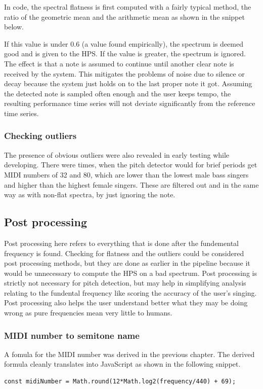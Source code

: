 In code, the spectral flatness is first computed with a fairly typical method, the ratio of the geometric mean and the arithmetic mean as shown in the snippet below.

If this value is under $0.6$ (a value found empirically), the spectrum is deemed good and is given to the HPS. If the value is greater, the spectrum is ignored. The effect is that a note is assumed to continue until another clear note is received by the system. This mitigates the problems of noise due to silence or decay because the system just holds on to the last proper note it got. Assuming the detected note is sampled often enough and the user keeps tempo, the resulting performance time series will not deviate significantly from the reference time series.

\subsubsection{Checking outliers}
The presence of obvious outliers were also revealed in early testing while developing. There were times, when the pitch detector would for brief periods get MIDI numbers of 32 and 80, which are lower than the lowest male bass singers and higher than the highest female singers. These are filtered out and in the same way as with non-flat spectra, by just ignoring the note. 

\subsection{Post processing}
Post processing here refers to everything that is done after the fundemental frequency is found. Checking for flatness and the outliers could be considered post processing methods, but they are done as earlier in the pipeline because it would be unnecessary to compute the HPS on a bad spectrum. Post processing is strictly not necessary for pitch detection, but may help in simplifying analysis relating to the fundental frequency like scoring the accuracy of the user's singing. Post processing also helps the user understand better what they may be doing wrong as pure frequencies mean very little to humans. 

\subsubsection{MIDI number to semitone name}
A fomula for the MIDI number was derived in the previous chapter. The derived formula cleanly translates into JavaScript as shown in the following snippet.
\begin{lstlisting}[style=javascript]
    const midiNumber = Math.round(12*Math.log2(frequency/440) + 69);
\end{lstlisting}

